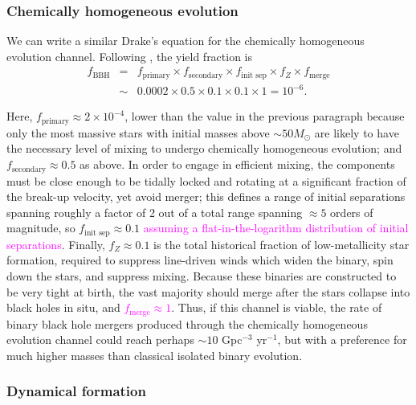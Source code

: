 \documentclass[iop,onecolumn]{revtex4}
\newcommand{\ilya}[1]{\textcolor{magenta}{#1}}
\begin{document}
\subsubsection{Chemically homogeneous evolution}

We can write a similar Drake's equation for the chemically homogeneous evolution channel.  Following \citet{MandeldeMink:2016},  the yield fraction is
\begin{eqnarray}
f_\textrm{BBH} &=& f_\textrm{primary} \times f_\textrm{secondary} \times f_\textrm{init sep} \times f_Z \times f_\textrm{merge} \nonumber \\
 & \sim & 0.0002 \times 0.5 \times 0.1 \times 0.1 \times 1 = 10^{-6}.
\end{eqnarray}

Here, $f_\textrm{primary} \approx 2 \times 10^{-4}$, lower than the value in the previous paragraph because only the most massive stars with initial masses above $\sim 50 M_\odot$ are likely to have the necessary level of mixing to undergo chemically homogeneous evolution; and $f_\textrm{secondary} \approx 0.5$ as above.  In order to engage in efficient mixing, the components must be close enough to be tidally locked and rotating at a significant fraction of the break-up velocity, yet avoid merger; this defines a range of initial separations spanning roughly a factor of 2 out of a total range spanning $\approx 5$ orders of magnitude, so $f_\textrm{init sep} \approx 0.1$ \ilya{assuming a flat-in-the-logarithm distribution of initial separations}.  Finally, $f_Z \approx 0.1$ is the total historical fraction of low-metallicity star formation, required to suppress line-driven winds which widen the binary, spin down the stars, and suppress mixing.  Because these binaries are constructed to be very tight at birth, the vast majority should merge after the stars collapse into black holes in situ, and \ilya{$f_\textrm{merge} \approx 1$}. Thus, if this channel is viable, the rate of binary black hole mergers produced through the chemically homogeneous evolution channel could reach perhaps $\sim 10$ Gpc$^{-3}$ yr$^{-1}$, but with a preference for much higher masses than classical isolated binary evolution.


\subsubsection{Dynamical formation}
\end{document}
